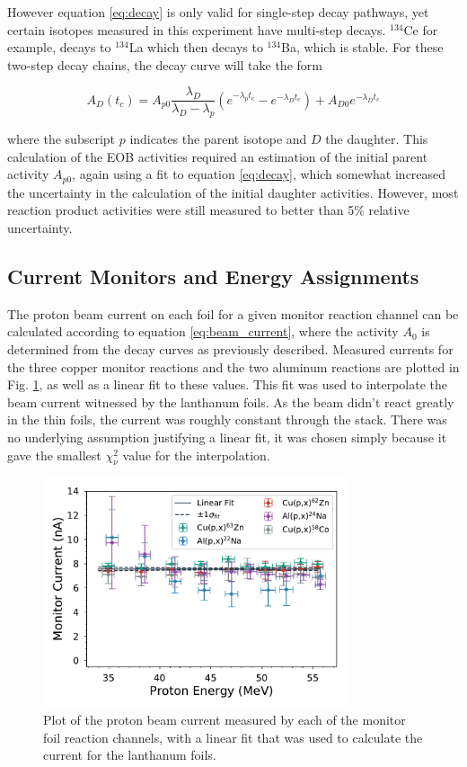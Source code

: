 \documentclass[aps,superscriptaddress,twocolumn,secnumarabic,balancelastpage,amsmath,amssymb,nofootinbib,floatfix]{revtex4-1}
\begin{document}
However equation \ref{eq:decay} is only valid for single-step decay pathways, yet certain isotopes measured in this experiment have multi-step decays.  $^{134}$Ce for example, decays to $^{134}$La which then decays to $^{134}$Ba, which is stable.  For these two-step decay chains, the decay curve will take the form

\begin{equation}
A_D(t_c) = A_{p0}\frac{\lambda_D}{\lambda_D - \lambda_p}(e^{-\lambda_p t_c}-e^{-\lambda_D t_c})+A_{D0}e^{-\lambda_D t_c}
\end{equation}

where the subscript $p$ indicates the parent isotope and $D$ the daughter.  This calculation of the EOB activities required an estimation of the initial parent activity $A_{p0}$, again using a fit to equation \ref{eq:decay}, which somewhat increased the uncertainty in the calculation of the initial daughter activities.  However, most reaction product activities were still measured to better than 5\% relative uncertainty.

\subsection{Current Monitors and Energy Assignments}
\label{monitors}

The proton beam current on each foil for a given monitor reaction channel can be calculated according to equation \ref{eq:beam_current}, where the activity $A_0$ is determined from the decay curves as previously described.  Measured currents for the three copper monitor reactions and the two aluminum reactions are plotted in Fig. \ref{fig:beam_current}, as well as a linear fit to these values. This fit was used to interpolate the beam current witnessed by the lanthanum foils.  As the beam didn't react greatly in the thin foils, the current was roughly constant through the stack. There was no underlying assumption justifying a linear fit, it was chosen simply because it gave the smallest $\chi^2_{\nu}$ value for the interpolation.

\begin{figure}[htb]
\includegraphics[width=9cm]{monitors/current_norm_mcnp}
\caption{Plot of the proton beam current measured by each of the monitor foil reaction channels, with a linear fit that was used to calculate the current for the lanthanum foils.
}
\label{fig:beam_current}
\end{figure}
\end{document}
